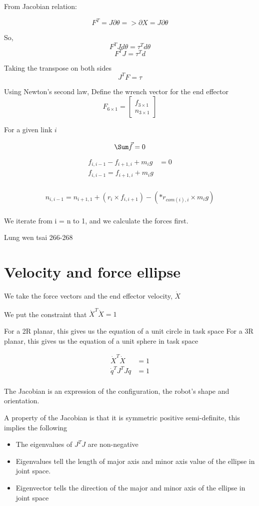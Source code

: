 \documentclass[11pt]{report}
\begin{document}
From Jacobian relation:

$$F^T = J \partial \theta => \partial X = J \partial \theta$$

So,
$$F^T J d \theta = \tau^T d \theta$$
$$F^T J = \tau^T d$$

Taking the transpose on both sides
$$J^{T} F  = \tau$$

Using Newton's second law,
Define the wrench vector for the end effector
$$F_{6 \times 1} = \begin{bmatrix}f_{3 \times 1} \\ n_{3 \times 1}\end{bmatrix}$$


For a given link \(i\)

$$\Sum \vec{f} = 0$$

\begin{align*}
f_{i,i-1} - f_{i+1,i} + m_ig &= 0 \\
f_{i,i-1} = f_{i+1,i} + m_ig  \\
\end{align*}

\begin{align*}
n_{i,i-1} = n_{i+1,1} + (r_i \times f_{i,i+1}) - (*r_{com(i),i} \times m_i g) \\
\end{align*}

We iterate from i = n to 1, and we calculate the forces first.

Lung wen tsai 266-268
\chapter{Velocity and force ellipse}
\label{sec:org2aee5a5}
We take the force vectors and the end effector velocity, \(\dot{X}\)

We put the constraint that \(\dot{X}^T\dot{X} = 1\)

For a 2R planar, this gives us the equation of a unit circle in task space
For a 3R planar, this gives us the equation of a unit sphere in task space

\begin{align*}
\dot{X}^T\dot{X} &= 1 \\
\dot{q}^{T}J^{T} J \dot{q} &= 1 \\
\end{align*}

The Jacobian is an expression of the configuration, the robot's shape and orientation.

A property of the Jacobian is that it is symmetric positive semi-definite, this implies the following
\begin{itemize}
\item The eigenvalues of \(J^{T} J\) are non-negative
\item Eigenvalues tell the length of major axis and minor axis value of the ellipse in joint space.
\item Eigenvector tells the direction of the major and minor axis of the ellipse in joint space
\end{itemize}
\end{document}
